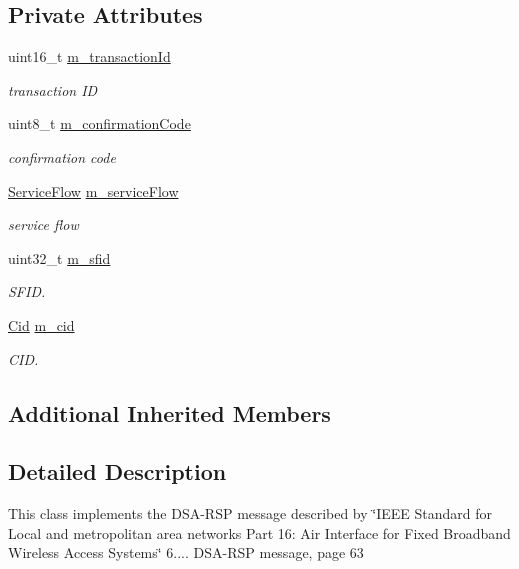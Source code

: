 \subsection*{Private Attributes}
\begin{DoxyCompactItemize}
\item 
uint16\+\_\+t \hyperlink{classns3_1_1DsaRsp_a65c30343bc903c7df3f78bf96e6c7929}{m\+\_\+transaction\+Id}
\begin{DoxyCompactList}\small\item\em transaction ID \end{DoxyCompactList}\item 
uint8\+\_\+t \hyperlink{classns3_1_1DsaRsp_ae273d2a96203b9e984690cedaabde067}{m\+\_\+confirmation\+Code}
\begin{DoxyCompactList}\small\item\em confirmation code \end{DoxyCompactList}\item 
\hyperlink{classns3_1_1ServiceFlow}{Service\+Flow} \hyperlink{classns3_1_1DsaRsp_a34fe5554195969f8a9d59f429213fbbf}{m\+\_\+service\+Flow}
\begin{DoxyCompactList}\small\item\em service flow \end{DoxyCompactList}\item 
uint32\+\_\+t \hyperlink{classns3_1_1DsaRsp_a0cee44f13b4be8f1efc51889b8bb9195}{m\+\_\+sfid}
\begin{DoxyCompactList}\small\item\em S\+F\+ID. \end{DoxyCompactList}\item 
\hyperlink{classns3_1_1Cid}{Cid} \hyperlink{classns3_1_1DsaRsp_abf09a834ae78fa7d5464611ce2d2bbd9}{m\+\_\+cid}
\begin{DoxyCompactList}\small\item\em C\+ID. \end{DoxyCompactList}\end{DoxyCompactItemize}
\subsection*{Additional Inherited Members}


\subsection{Detailed Description}
This class implements the D\+S\+A-\/\+R\+SP message described by \char`\"{}\+I\+E\+E\+E Standard for
  Local and metropolitan area networks Part 16\+: Air Interface for Fixed Broadband Wireless Access Systems\char`\"{} 6.... D\+S\+A-\/\+R\+SP message, page 63

